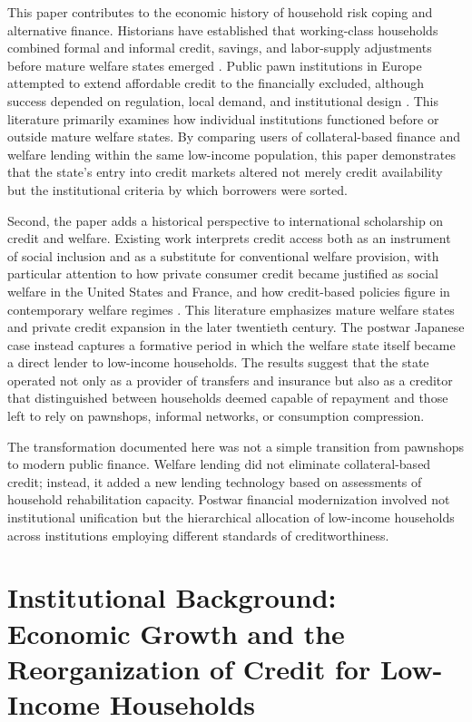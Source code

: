 \documentclass[12pt,a4paper]{article}
\begin{document}
This paper contributes to the economic history of household risk coping and alternative finance. Historians have established that working-class households combined formal and informal credit, savings, and labor-supply adjustments before mature welfare states emerged \citep{ScottWalker2012, Ogasawara2024, Inoue2021}. Public pawn institutions in Europe attempted to extend affordable credit to the financially excluded, although success depended on regulation, local demand, and institutional design \citep{McLaughlin2013, PastureaBlancheton2014}. This literature primarily examines how individual institutions functioned before or outside mature welfare states. By comparing users of collateral-based finance and welfare lending within the same low-income population, this paper demonstrates that the state's entry into credit markets altered not merely credit availability but the institutional criteria by which borrowers were sorted.

Second, the paper adds a historical perspective to international scholarship on credit and welfare. Existing work interprets credit access both as an instrument of social inclusion and as a substitute for conventional welfare provision, with particular attention to how private consumer credit became justified as social welfare in the United States and France, and how credit-based policies figure in contemporary welfare regimes \citep{Trumbull2012, Mertens2017}. This literature emphasizes mature welfare states and private credit expansion in the later twentieth century. The postwar Japanese case instead captures a formative period in which the welfare state itself became a direct lender to low-income households. The results suggest that the state operated not only as a provider of transfers and insurance but also as a creditor that distinguished between households deemed capable of repayment and those left to rely on pawnshops, informal networks, or consumption compression.

The transformation documented here was not a simple transition from pawnshops to modern public finance. Welfare lending did not eliminate collateral-based credit; instead, it added a new lending technology based on assessments of household rehabilitation capacity. Postwar financial modernization involved not institutional unification but the hierarchical allocation of low-income households across institutions employing different standards of creditworthiness.

\newpage

\section{Institutional Background: Economic Growth and the Reorganization of Credit for Low-Income Households}
\end{document}
